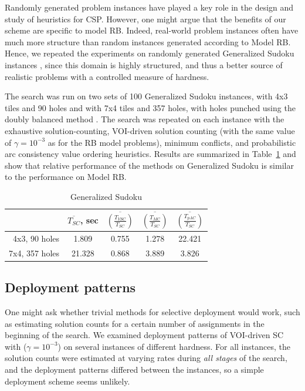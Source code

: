 Randomly generated problem instances have played a key role in the
design and study of heuristics for CSP. However, one might argue that the
benefits of our scheme are specific to model RB. Indeed, real-world problem
instances often have much more structure than random instances
generated according to Model RB. Hence, we repeated the experiments
on randomly generated Generalized Sudoku
instances \cite{Ansotegui.sudoku}, since this domain is highly
structured, and thus a better source of realistic problems with a controlled
measure of hardness.

The search was run on two sets of 100 Generalized Sudoku instances,
with 4x3 tiles and 90 holes and with 7x4 tiles and 357 holes, with
holes punched using the doubly balanced method
\cite{Ansotegui.sudoku}. The search was repeated on each instance with
the exhaustive solution-counting, VOI-driven solution counting (with
the same value of $\gamma=10^{-3}$ as for the RB model problems),
minimum conflicts, and probabilistic arc
consistency value ordering heuristics. Results
are summarized in Table~\ref{tbl:sudoku} and show that relative
performance of the methods on Generalized Sudoku is similar to the
performance on Model RB.
\begin{table}[h]
\begin{center}
\small
\begin{tabular}{r|c|c|c|c}
               & $\overline {T_{SC}}$, sec & $\overline {\left(\frac
                   {T_{VSC}} {T_{SC}}\right)}$ & $\overline
               {\left(\frac {T_{MC}} {T_{SC}}\right)}$ & $\overline
               {\left(\frac {T_{pAC}} {T_{SC}} \right)}$ \\  \hline
4x3, 90 holes &  1.809 & 0.755 & 1.278 & 22.421 \\  \hline
7x4, 357 holes & 21.328 & 0.868 & 3.889 & 3.826
\end{tabular}
\end{center}
\caption{Generalized Sudoku}
\label{tbl:sudoku}
\end{table}

\subsection{Deployment patterns}

One might ask whether trivial methods for selective deployment would
work, such as estimating solution counts for a certain number of
assignments in the beginning of the search. We examined deployment
patterns of VOI-driven SC with ($\gamma=10^{-3}$) on several instances
of different hardness. For all instances, the solution counts were
estimated at varying rates during \emph{all stages} of the search, and
the deployment patterns differed between the instances, so a simple
deployment scheme seems unlikely.


